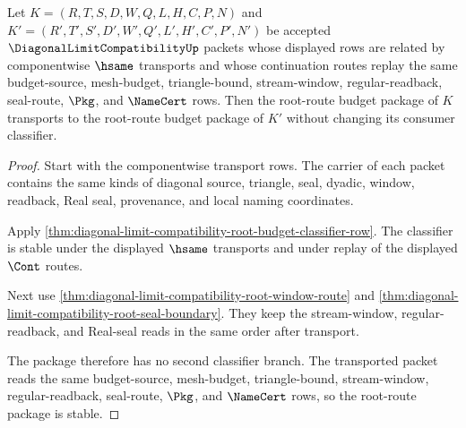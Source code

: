 \begin{theorem}
\label{thm:diagonal-limit-compatibility-root-route-transport-stability}
Let $K=(R,T,S,D,W,Q,L,H,C,P,N)$ and $K'=(R',T',S',D',W',Q',L',H',C',P',N')$ be accepted $\DiagonalLimitCompatibilityUp$ packets whose displayed rows are related by componentwise $\hsame$ transports and whose continuation routes replay the same budget-source, mesh-budget, triangle-bound, stream-window, regular-readback, seal-route, $\Pkg$, and $\NameCert$ rows. Then the root-route budget package of $K$ transports to the root-route budget package of $K'$ without changing its consumer classifier.
\end{theorem}
\begin{proof}
Start with the componentwise transport rows. The carrier of each packet contains the same kinds of diagonal source, triangle, seal, dyadic, window, readback, Real seal, provenance, and local naming coordinates.

Apply \autoref{thm:diagonal-limit-compatibility-root-budget-classifier-row}. The classifier is stable under the displayed $\hsame$ transports and under replay of the displayed $\Cont$ routes.

Next use \autoref{thm:diagonal-limit-compatibility-root-window-route} and \autoref{thm:diagonal-limit-compatibility-root-seal-boundary}. They keep the stream-window, regular-readback, and Real-seal reads in the same order after transport.

The package therefore has no second classifier branch. The transported packet reads the same budget-source, mesh-budget, triangle-bound, stream-window, regular-readback, seal-route, $\Pkg$, and $\NameCert$ rows, so the root-route package is stable.
\end{proof}


